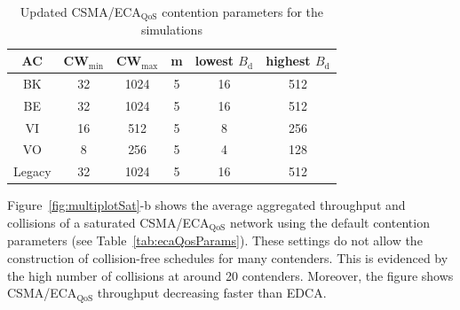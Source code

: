 \begin{itemize}
%
	
%
	
	\begin{table}[tb!]
		\centering
		\caption{Updated CSMA/ECA$_{\text{QoS}}$ contention parameters for the simulations}
		\label{tab:newQoSparams}
		\begin{tabular}{|c|c|c|c|c|c|}
			\hline
			{\bfseries AC} & {\bfseries CW$_{\min}$} & {\bfseries CW$_{\max}$} & {\bfseries m} & {\bfseries lowest $B_{\text{d}}$} & {\bfseries highest $B_{\text{d}}$}\\
			\hline
			BK		       &	32				&		1024		  & 		5	&			16		        &		512\\
			BE		       &	32				&		1024		  &		5	&			16		        &		512\\
			VI		       &	16				&		512			  & 		5	&			8		        &		256\\
			VO		       &	8				&		256			  & 		5	&			4		        &		128\\
			Legacy	       &	32				&		1024		  & 		5	&			16		        &		512\\
			\hline
		\end{tabular}
	\end{table}

Figure~\ref{fig:multiplotSat}-b shows the average aggregated throughput and collisions of a saturated CSMA/ECA$_{\text{QoS}}$ network using the default contention parameters (see Table~\ref{tab:ecaQosParams}). These settings do not allow the construction of collision-free schedules for many contenders. This is evidenced by the high number of collisions at around 20 contenders. Moreover, the figure shows CSMA/ECA$_{\text{QoS}}$ throughput decreasing faster than EDCA.


\end{itemize}
